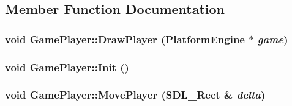 \subsection{Member Function Documentation}
\hypertarget{class_game_player_3394352e57e918eb17fec46498f5e348}{
\subsubsection[{DrawPlayer}]{\setlength{\rightskip}{0pt plus 5cm}void GamePlayer::DrawPlayer ({\bf PlatformEngine} $\ast$ {\em game})}}
\label{d7/df6/class_game_player_3394352e57e918eb17fec46498f5e348}


\hypertarget{class_game_player_61b39fe229f10d4f93d4eb96754a2961}{
\subsubsection[{Init}]{\setlength{\rightskip}{0pt plus 5cm}void GamePlayer::Init ()}}
\label{d7/df6/class_game_player_61b39fe229f10d4f93d4eb96754a2961}


\hypertarget{class_game_player_46aa70e41a260b0ea8afdae38052d65c}{
\subsubsection[{MovePlayer}]{\setlength{\rightskip}{0pt plus 5cm}void GamePlayer::MovePlayer (SDL\_\-Rect \& {\em delta})}}
\label{d7/df6/class_game_player_46aa70e41a260b0ea8afdae38052d65c}


